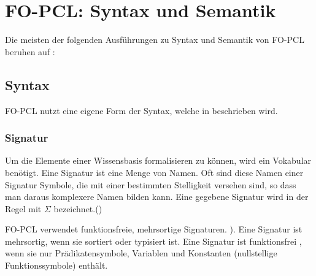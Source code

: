 \documentclass[draft]{scrreprt}
\begin{document}
\section{FO-PCL: Syntax und Semantik}
Die meisten der folgenden Ausführungen zu Syntax und Semantik von FO-PCL beruhen auf \cite[Kap. 6.1, 6.2]{Fis10}:

\subsection{Syntax}\label{sec: Syntax}

FO-PCL nutzt eine eigene Form der Syntax, welche in \cite[Kap. 6.1]{Fis10} beschrieben wird.

\subsubsection{Signatur}
\label{Signatur}
Um die Elemente einer Wissensbasis formalisieren zu können, wird ein Vokabular benötigt. Eine Signatur ist eine Menge von Namen. Oft sind diese Namen einer Signatur Symbole, die mit einer bestimmten Stelligkeit versehen sind, so dass man daraus komplexere Namen bilden kann.  
Eine gegebene Signatur  wird in der Regel mit $ \Sigma $  bezeichnet.(\cite[Kap. 3.2, S. 29]{BKI08})

FO-PCL verwendet funktionsfreie, mehrsortige Signaturen. \cite[Kap. 6.2, S. 124]{Fis10}).
Eine Signatur ist mehrsortig, wenn sie sortiert oder typisiert ist.
Eine Signatur ist funktionsfrei , wenn sie nur Prädikatensymbole, Variablen und Konstanten (nullstellige Funktionssymbole) enthält.
\end{document}
